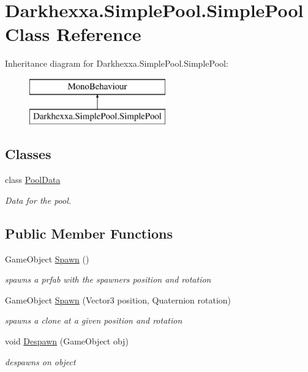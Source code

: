 \hypertarget{class_darkhexxa_1_1_simple_pool_1_1_simple_pool}{\section{Darkhexxa.\-Simple\-Pool.\-Simple\-Pool Class Reference}
\label{class_darkhexxa_1_1_simple_pool_1_1_simple_pool}
}
Inheritance diagram for Darkhexxa.\-Simple\-Pool.\-Simple\-Pool\-:\begin{figure}[H]
\begin{center}
\leavevmode
\includegraphics[height=2.000000cm]{class_darkhexxa_1_1_simple_pool_1_1_simple_pool}
\end{center}
\end{figure}
\subsection*{Classes}
\begin{DoxyCompactItemize}
\item 
class \hyperlink{class_darkhexxa_1_1_simple_pool_1_1_simple_pool_1_1_pool_data}{Pool\-Data}
\begin{DoxyCompactList}\small\item\em Data for the pool. \end{DoxyCompactList}\end{DoxyCompactItemize}
\subsection*{Public Member Functions}
\begin{DoxyCompactItemize}
\item 
Game\-Object \hyperlink{class_darkhexxa_1_1_simple_pool_1_1_simple_pool_a7f29a18dde77e02e1cdd8ebd69fb6659}{Spawn} ()
\begin{DoxyCompactList}\small\item\em spawns a prfab with the spawners position and rotation \end{DoxyCompactList}\item 
Game\-Object \hyperlink{class_darkhexxa_1_1_simple_pool_1_1_simple_pool_a30e8d7d6d02759f1d2de167a2c1d22e4}{Spawn} (Vector3 position, Quaternion rotation)
\begin{DoxyCompactList}\small\item\em spawns a clone at a given position and rotation \end{DoxyCompactList}\item 
void \hyperlink{class_darkhexxa_1_1_simple_pool_1_1_simple_pool_ace3fe63b086d4c556517b6f7070874d9}{Despawn} (Game\-Object obj)
\begin{DoxyCompactList}\small\item\em despawns on object \end{DoxyCompactList}\end{DoxyCompactItemize}
